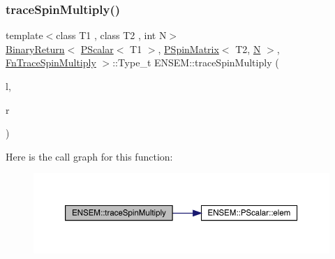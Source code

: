 \subsubsection{\texorpdfstring{traceSpinMultiply()}{traceSpinMultiply()}\hspace{0.1cm}{\footnotesize\ttfamily [3/3]}}
{\footnotesize\ttfamily template$<$class T1 , class T2 , int N$>$ \\
\mbox{\hyperlink{structENSEM_1_1BinaryReturn}{Binary\+Return}}$<$ \mbox{\hyperlink{classENSEM_1_1PScalar}{P\+Scalar}}$<$ T1 $>$, \mbox{\hyperlink{classENSEM_1_1PSpinMatrix}{P\+Spin\+Matrix}}$<$ T2, \mbox{\hyperlink{adat__devel_2lib_2hadron_2operator__name__util_8cc_a7722c8ecbb62d99aee7ce68b1752f337}{N}} $>$, \mbox{\hyperlink{structENSEM_1_1FnTraceSpinMultiply}{Fn\+Trace\+Spin\+Multiply}} $>$\+::Type\+\_\+t E\+N\+S\+E\+M\+::trace\+Spin\+Multiply (\begin{DoxyParamCaption}\item[{const \mbox{\hyperlink{classENSEM_1_1PScalar}{P\+Scalar}}$<$ T1 $>$ \&}]{l,  }\item[{const \mbox{\hyperlink{classENSEM_1_1PSpinMatrix}{P\+Spin\+Matrix}}$<$ T2, \mbox{\hyperlink{adat__devel_2lib_2hadron_2operator__name__util_8cc_a7722c8ecbb62d99aee7ce68b1752f337}{N}} $>$ \&}]{r }\end{DoxyParamCaption})\hspace{0.3cm}{\ttfamily [inline]}}

Here is the call graph for this function\+:\nopagebreak
\begin{figure}[H]
\begin{center}
\leavevmode
\includegraphics[width=350pt]{d6/df5/group__primspinmatrix_ga2dc2ab87ff63abab3c74a0a1f1dd3d09_cgraph}
\end{center}
\end{figure}
